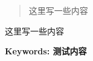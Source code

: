 
\begin{abstract}
  这里写一些内容
  \par{}
\end{abstract}

\begin{abstract*}
  这里写一些内容
  \par\textbf{Keywords: 测试内容}
\end{abstract*}

